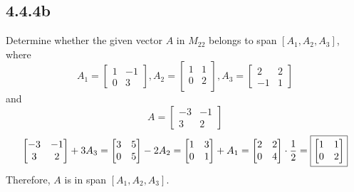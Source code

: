 \documentclass[letterpaper]{report}
\begin{document}
\subsection{4.4.4b}%
\label{sub:4.4.4b}
Determine whether the given vector $A$ in $M_{22}$ belongs to span $[A_1, A_2, A_3]$, where 
\[
A_1 = 
\begin{bmatrix} 
    1 & -1 \\
    0 & 3
\end{bmatrix} , 
A_2 = 
\begin{bmatrix} 
    1 & 1 \\
    0 & 2 \\ 
\end{bmatrix} , 
A_3 = 
\begin{bmatrix} 
    2 & 2 \\
    -1 & 1 
\end{bmatrix} 
\]
and 
\[
A = 
\begin{bmatrix} 
    -3 & -1 \\
    3 & 2
\end{bmatrix} 
\] 
\[
\begin{bmatrix} 
    -3 & -1 \\
    3 & 2 
\end{bmatrix} + 3A_3 = 
\begin{bmatrix} 
    3 & 5 \\
    0 & 5 
\end{bmatrix}  - 2A_2 = 
\begin{bmatrix} 
    1 & 3 \\
    0 & 1
\end{bmatrix} + A_1 = 
\begin{bmatrix} 
    2 & 2 \\
    0 & 4
\end{bmatrix} \cdot \frac{1}{2} = 
\fbox{$
\begin{bmatrix} 
    1 & 1 \\
    0 & 2 
\end{bmatrix}$}
\] 
Therefore, $A$ is in span $[A_1, A_2, A_3]$. 
\end{document}
